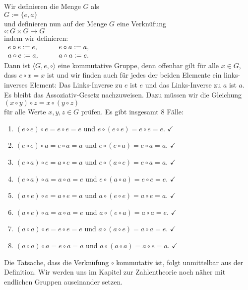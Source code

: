 \begin{enumerate}
      Wir definieren die Menge $G$ als
      \\[0.2cm]
      \hspace*{1.3cm}
      $G := \{ e, a \}$
      \\[0.2cm]
      und definieren nun auf der Menge $G$ eine Verkn\"{u}fung
      \\[0.2cm]
      \hspace*{1.3cm}
      $\circ: G \times G \rightarrow G$
      \\[0.2cm]
      indem wir definieren:
      \\[0.2cm]
      \hspace*{1.3cm}
      $
      \begin{array}[t]{lcl}
        e \circ e := e, & \quad & e \circ a := a, \\
        a \circ e := a, & \quad & a \circ a := e. 
      \end{array}
      $
      \\[0.2cm]
      Dann ist $\langle G, e, \circ \rangle$ eine kommutative Gruppe, denn offenbar gilt f\"{u}r alle $x \in G$, dass 
      $e \circ x = x$ ist und wir finden auch f\"{u}r jedes der beiden Elemente ein links-inverses Element:
      Das Links-Inverse zu $e$ ist $e$ und das Links-Inverse zu $a$ ist $a$.  Es bleibt das
      Assoziativ-Gesetz nachzuweisen.  Dazu m\"{u}ssen wir die Gleichung
      \\[0.2cm]
      \hspace*{1.3cm}
      $(x \circ y) \circ z = x \circ (y \circ z)$
      \\[0.2cm]
      f\"{u}r alle Werte $x,y,z \in G$ pr\"{u}fen.  Es gibt insgesamt 8 F\"{a}lle:
      \begin{enumerate}
      \item $(e \circ e) \circ e = e \circ e = e$ und $e \circ (e \circ e) = e \circ e = e$. $\checkmark$
      \item $(e \circ e) \circ a = e \circ a = a$ und $e \circ (e \circ a) = e \circ a = a$. $\checkmark$
      \item $(e \circ a) \circ e = a \circ e = a$ und $e \circ (a \circ e) = e \circ a = a$. $\checkmark$
      \item $(e \circ a) \circ a = a \circ a = e$ und $e \circ (a \circ a) = e \circ e = e$. $\checkmark$
      \item $(a \circ e) \circ e = a \circ e = a$ und $a \circ (e \circ e) = a \circ e = a$. $\checkmark$
      \item $(a \circ e) \circ a = a \circ a = e$ und $a \circ (e \circ a) = a \circ a = e$. $\checkmark$
      \item $(a \circ a) \circ e = e \circ e = e$ und $a \circ (a \circ e) = a \circ a = e$. $\checkmark$
      \item $(a \circ a) \circ a = e \circ a = a$ und $a \circ (a \circ a) = a \circ e = a$. $\checkmark$
      \end{enumerate}
      Die Tatsache, dass die Verkn\"{u}fung $\circ$ kommutativ ist, folgt unmittelbar aus der Definition.
      Wir werden uns im Kapitel zur Zahlentheorie noch n\"{a}her mit endlichen Gruppen auseinander
      setzen.
      \eox
\end{enumerate}

